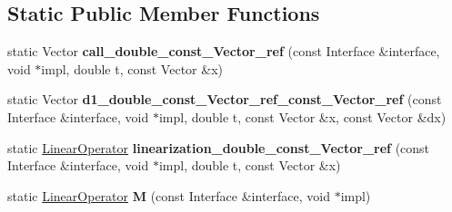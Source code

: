 \subsection*{\-Static \-Public \-Member \-Functions}
\begin{DoxyCompactItemize}
\item 
\hypertarget{structSpacy_1_1DynamicC1OperatorDetail_1_1execution__wrapper_3_01Interface_00_01std_1_1reference__wrapper_3_01Impl_01_4_01_4_aa3997a6453f617478093dcdff51ca10a}{static \-Vector {\bfseries call\-\_\-double\-\_\-const\-\_\-\-Vector\-\_\-ref} (const \-Interface \&interface, void $\ast$impl, double t, const \-Vector \&x)}\label{structSpacy_1_1DynamicC1OperatorDetail_1_1execution__wrapper_3_01Interface_00_01std_1_1reference__wrapper_3_01Impl_01_4_01_4_aa3997a6453f617478093dcdff51ca10a}

\item 
\hypertarget{structSpacy_1_1DynamicC1OperatorDetail_1_1execution__wrapper_3_01Interface_00_01std_1_1reference__wrapper_3_01Impl_01_4_01_4_acdf766eecd74dde8c82cdd5d3baaa7c9}{static \-Vector {\bfseries d1\-\_\-double\-\_\-const\-\_\-\-Vector\-\_\-ref\-\_\-const\-\_\-\-Vector\-\_\-ref} (const \-Interface \&interface, void $\ast$impl, double t, const \-Vector \&x, const \-Vector \&dx)}\label{structSpacy_1_1DynamicC1OperatorDetail_1_1execution__wrapper_3_01Interface_00_01std_1_1reference__wrapper_3_01Impl_01_4_01_4_acdf766eecd74dde8c82cdd5d3baaa7c9}

\item 
\hypertarget{structSpacy_1_1DynamicC1OperatorDetail_1_1execution__wrapper_3_01Interface_00_01std_1_1reference__wrapper_3_01Impl_01_4_01_4_ae22943504e7c6b2a637fa3fd9bb7042e}{static \hyperlink{classSpacy_1_1LinearOperator}{\-Linear\-Operator} {\bfseries linearization\-\_\-double\-\_\-const\-\_\-\-Vector\-\_\-ref} (const \-Interface \&interface, void $\ast$impl, double t, const \-Vector \&x)}\label{structSpacy_1_1DynamicC1OperatorDetail_1_1execution__wrapper_3_01Interface_00_01std_1_1reference__wrapper_3_01Impl_01_4_01_4_ae22943504e7c6b2a637fa3fd9bb7042e}

\item 
\hypertarget{structSpacy_1_1DynamicC1OperatorDetail_1_1execution__wrapper_3_01Interface_00_01std_1_1reference__wrapper_3_01Impl_01_4_01_4_ad77bbdf37512675129ba4940cdb1712d}{static \hyperlink{classSpacy_1_1LinearOperator}{\-Linear\-Operator} {\bfseries \-M} (const \-Interface \&interface, void $\ast$impl)}\label{structSpacy_1_1DynamicC1OperatorDetail_1_1execution__wrapper_3_01Interface_00_01std_1_1reference__wrapper_3_01Impl_01_4_01_4_ad77bbdf37512675129ba4940cdb1712d}


\end{DoxyCompactItemize}
